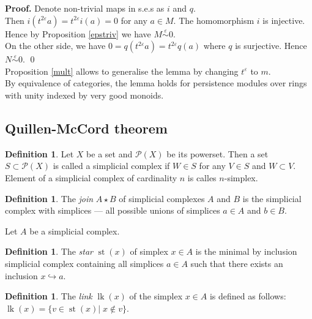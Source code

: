\documentclass[english,12pt]{article}
\newcounter{stmcounter}[section]
\numberwithin{equation}{section}
\theoremstyle{definition}
\newtheorem{definition}[stmcounter]{Definition}
\theoremstyle{remark}
\newenvironment{pf}{\noindent\textbf{Proof.}}{\qed}
\newcommand{\define}[1]{{\textit{#1}}}
\begin{document}
\begin{pf}
  Denote non-trivial maps in s.e.s as $i$ and $q$.\\

  Then $i(t^{2\varepsilon}a) = t^{2\varepsilon}i(a) = 0$ for any $a \in M$. The homomorphism $i$ is injective. Hence by Proposition \ref{epstriv} we have $M \stackrel{\varepsilon}{\sim} 0$.\\

  On the other side, we have $0 = q(t^{2\varepsilon}a) = t^{2\varepsilon}q(a)$ where $q$ is surjective. Hence $N \stackrel{\varepsilon}{\sim} 0$.
\end{pf}\\

Proposition \ref{mult} allows to generalise the lemma by changing $t^{\varepsilon}$ to $m$.\\

By equivalence of categories, the lemma holds for persistence modules over rings with unity indexed by very good monoids.

\subsection{Quillen-McCord theorem}

\begin{definition}
  Let $X$ be a set and $\mathcal{P}(X)$ be its powerset. Then a set $S \subset \mathcal{P}(X)$ is called a simplicial complex if $W \in S$ for any $V \in S$ and $W \subset V$. Element of a simplicial complex of cardinality $n$ is calles $n$-simplex.
\end{definition}

\begin{definition}
  The \define{join} $A \star B$ of simplicial complexes $A$ and $B$ is the simplicial complex with simplices --- all possible unions of simplices $a \in A$ and $b \in B$.
\end{definition}

Let $A$ be a simplicial complex.

\begin{definition}
  The \define{star} $\operatorname{st}(x)$ of simplex $x \in A$ is the minimal by inclusion simplicial complex containing all simplices $a \in A$ such that there exists an inclusion $x \hookrightarrow a$.
\end{definition}

\begin{definition}
  The \define{link} $\operatorname{lk}(x)$ of the simplex $x \in A$ is defined as follows: $\operatorname{lk}(x) = \{v \in \operatorname{st}(x)|\; x \not\in v\}$.
\end{definition}
\end{document}
